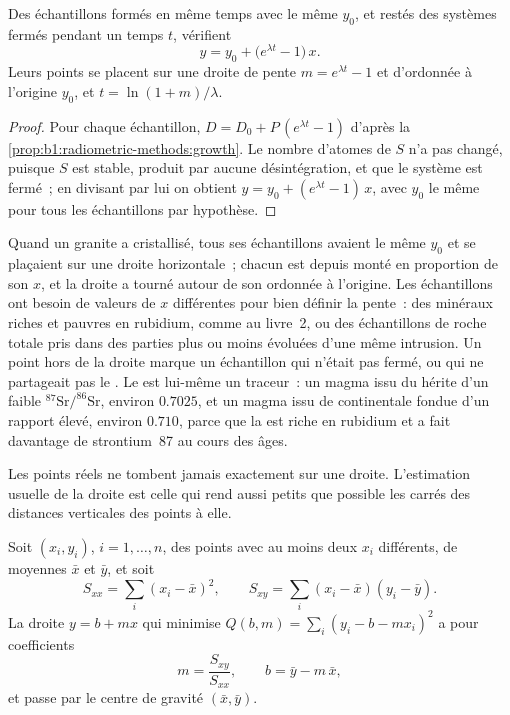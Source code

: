 \begin{theorem}[L'isochrone]\label{thm:b1:radiometric-methods:isochron}
Des échantillons formés en même temps avec le même  $y_0$, et restés
des systèmes fermés pendant un temps $t$, vérifient
\[
  y = y_0 + \bigl(e^{\lambda t} - 1\bigr)\,x .
\]
Leurs points se placent sur une droite de pente $m = e^{\lambda t} - 1$ et
d'ordonnée à l'origine $y_0$, et $t = \ln(1+m)/\lambda$.
\end{theorem}

\begin{proof}
Pour chaque échantillon, $D = D_0 + P\,(e^{\lambda t} - 1)$ d'après la
\cref{prop:b1:radiometric-methods:growth}. Le nombre d'atomes de $S$ n'a pas
changé, puisque $S$ est stable, produit par aucune désintégration, et que le système est fermé~;
en divisant par lui on obtient $y = y_0 + (e^{\lambda t} - 1)\,x$, avec $y_0$ le même pour
tous les échantillons par hypothèse.
\end{proof}

Quand un granite a cristallisé, tous ses échantillons avaient le même $y_0$ et se plaçaient sur une
droite horizontale~; chacun est depuis monté en proportion de son $x$, et la droite
a tourné autour de son ordonnée à l'origine. Les échantillons ont besoin de valeurs de $x$ différentes pour
bien définir la pente~: des minéraux riches et pauvres en rubidium, comme au livre~2,
ou des échantillons de roche totale pris dans des parties plus ou moins évoluées d'une même intrusion. Un
point hors de la droite marque un échantillon qui n'était pas fermé, ou qui ne partageait pas
le . Le  est lui-même un traceur~: un magma issu du 
hérite d'un faible $^{87}\mathrm{Sr}/^{86}\mathrm{Sr}$, environ $0.7025$, et un magma issu de
 continentale fondue d'un rapport élevé, environ $0.710$, parce que la  est riche en
rubidium et a fait davantage de strontium~87 au cours des âges.

Les points réels ne tombent jamais exactement sur une droite. L'estimation usuelle de la droite est
celle qui rend aussi petits que possible les carrés des distances verticales des points à elle.

\begin{proposition}\label{prop:b1:radiometric-methods:lsq}
Soit $(x_i, y_i)$, $i = 1, \dots, n$, des points avec au moins deux $x_i$ différents,
de moyennes $\bar x$ et $\bar y$, et soit
\[
  S_{xx} = \sum_i (x_i - \bar x)^2, \qquad S_{xy} = \sum_i (x_i - \bar x)(y_i - \bar y).
\]
La droite $y = b + m x$ qui minimise $Q(b, m) = \sum_i (y_i - b - m x_i)^2$ a pour coefficients
\[
  m = \frac{S_{xy}}{S_{xx}}, \qquad b = \bar y - m\,\bar x ,
\]
et passe par le centre de gravité $(\bar x, \bar y)$.
\end{proposition}

